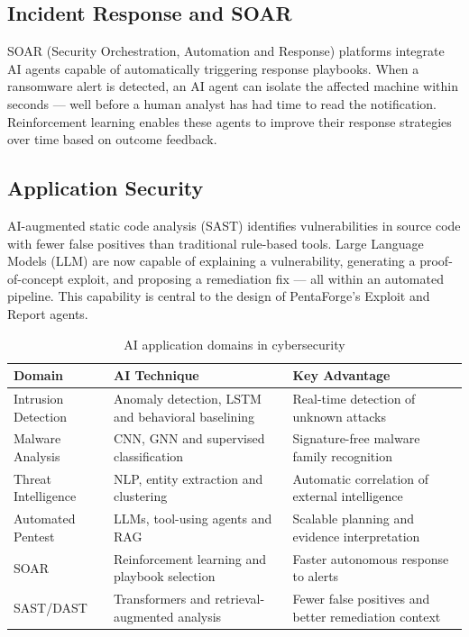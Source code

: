 \documentclass[12pt,a4paper]{report}
\begin{document}
\subsection{Incident Response and SOAR}

SOAR (Security Orchestration, Automation and Response) platforms integrate AI
agents capable of automatically triggering response playbooks. When a ransomware
alert is detected, an AI agent can isolate the affected machine within seconds ---
well before a human analyst has had time to read the notification. Reinforcement
learning enables these agents to improve their response strategies over time based
on outcome feedback.

\subsection{Application Security}

AI-augmented static code analysis (SAST) identifies vulnerabilities in source code
with fewer false positives than traditional rule-based tools. Large Language Models
(LLM) are now capable of explaining a vulnerability, generating a proof-of-concept
exploit, and proposing a remediation fix --- all within an automated pipeline. This
capability is central to the design of PentaForge's Exploit and Report agents.

\begin{table}[H]
    \centering
    \caption{AI application domains in cybersecurity}
    \label{tab:ai_domains}
    \renewcommand{\arraystretch}{1.35}
    \begin{tabular}{|p{}|p{}|p{}|}
        \hline
        \textbf{Domain} & \textbf{AI Technique} & \textbf{Key Advantage} \\
        \hline
        Intrusion Detection & Anomaly detection, LSTM and behavioral baselining & Real-time detection of unknown attacks \\
        \hline
        Malware Analysis & CNN, GNN and supervised classification & Signature-free malware family recognition \\
        \hline
        Threat Intelligence & NLP, entity extraction and clustering & Automatic correlation of external intelligence \\
        \hline
        Automated Pentest & LLMs, tool-using agents and RAG & Scalable planning and evidence interpretation \\
        \hline
        SOAR & Reinforcement learning and playbook selection & Faster autonomous response to alerts \\
        \hline
        SAST/DAST & Transformers and retrieval-augmented analysis & Fewer false positives and better remediation context \\
        \hline
    \end{tabular}
\end{table}
\end{document}
